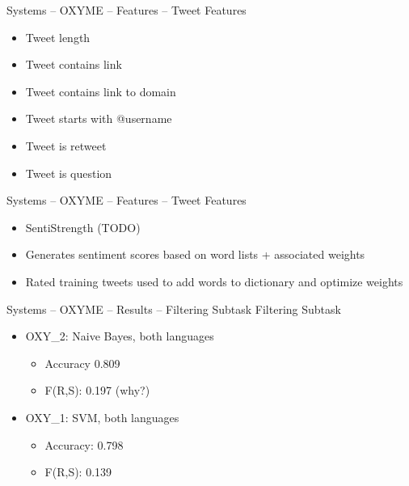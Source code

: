 \documentclass[12pt,a4paper]{beamer}
\begin{document}
\begin{frame}{Systems -- OXYME -- Features -- Tweet Features}
\begin{itemize}
\item Tweet length
\item Tweet contains link
\item Tweet contains link to domain
\item Tweet starts with @username
\item Tweet is retweet
\item Tweet is question
\end{itemize}

\end{frame}


\begin{frame}{Systems -- OXYME -- Features -- Tweet Features}
\begin{itemize}
\item SentiStrength (TODO)
\item Generates sentiment scores based on word lists + associated weights
\item Rated training tweets used to add words to dictionary and optimize weights
\end{itemize}

\end{frame}

\begin{frame}{Systems -- OXYME -- Results -- Filtering Subtask}
Filtering Subtask
\begin{itemize}
\item OXY\_2: Naive Bayes, both languages
  \begin{itemize}
  \item Accuracy 0.809
  \item F(R,S): 0.197 (why?)
  \end{itemize}
\item OXY\_1: SVM, both languages
  \begin{itemize}
  \item Accuracy: 0.798
  \item F(R,S): 0.139
  \end{itemize}
\end{itemize}

\end{frame}
\end{document}
